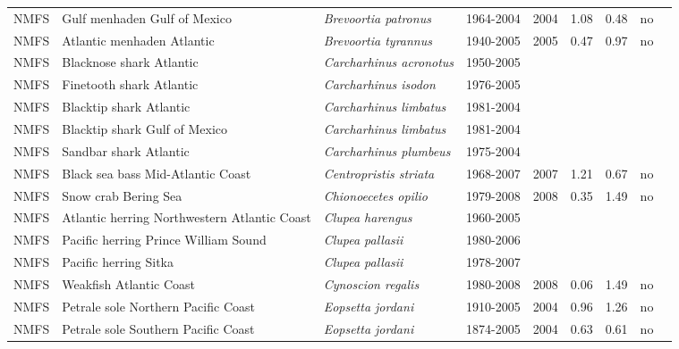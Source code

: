 \begin{longtable}{p{1.8cm}p{4cm}p{4cm}ccccp{1.9cm}c}
  NMFS & Gulf menhaden Gulf of Mexico & \textit{Brevoortia patronus} & 1964-2004 & 2004 & 1.08 & 0.48 & no & \cite{GILROY-MENHADENGM-2007.pdf} \\ 
  NMFS & Atlantic menhaden Atlantic & \textit{Brevoortia tyrannus} & 1940-2005 & 2005 & 0.47 & 0.97 & no & \cite{Atl.Menhaden-ASMFC-2006.pdf} \\ 
  NMFS & Blacknose shark Atlantic & \textit{Carcharhinus acronotus} & 1950-2005 &  &  &  &  & \cite{SmallcoastalAtl2007-SEFSC.pdf} \\ 
  NMFS & Finetooth shark Atlantic & \textit{Carcharhinus isodon} & 1976-2005 &  &  &  &  & \cite{SmallcoastalAtl2007-SEFSC.pdf} \\ 
  NMFS & Blacktip shark Atlantic & \textit{Carcharhinus limbatus} & 1981-2004 &  &  &  &  & \cite{LargeCoastalAtl2006-SEFSC.pdf} \\ 
  NMFS & Blacktip shark Gulf of Mexico & \textit{Carcharhinus limbatus} & 1981-2004 &  &  &  &  & \cite{LargeCoastalAtl2006-SEFSC.pdf} \\ 
  NMFS & Sandbar shark Atlantic & \textit{Carcharhinus plumbeus} & 1975-2004 &  &  &  &  & \cite{LargeCoastalAtl2006-SEFSC.pdf} \\ 
  NMFS & Black sea bass Mid-Atlantic Coast & \textit{Centropristis striata} & 1968-2007 & 2007 & 1.21 & 0.67 & no & \cite{DataPoorReviewPanelReportFinal-1-20-09.pdf} \\ 
  NMFS & Snow crab Bering Sea & \textit{Chionoecetes opilio} & 1979-2008 & 2008 & 0.35 & 1.49 & no & \cite{CRABSAFE2008.pdf} \\ 
  NMFS & Atlantic herring Northwestern Atlantic Coast & \textit{Clupea harengus} & 1960-2005 &  &  &  &  & \cite{Herring2006.pdf} \\ 
  NMFS & Pacific herring Prince William Sound & \textit{Clupea pallasii} & 1980-2006 &  &  &  &  & \cite{NA} \\ 
  NMFS & Pacific herring Sitka & \textit{Clupea pallasii} & 1978-2007 &  &  &  &  & \cite{NA} \\ 
  NMFS & Weakfish Atlantic Coast & \textit{Cynoscion regalis} & 1980-2008 & 2008 & 0.06 & 1.49 & no & \cite{NEFSC-Weakfish-2009.pdf} \\ 
  NMFS & Petrale sole Northern Pacific Coast & \textit{Eopsetta jordani} & 1910-2005 & 2004 & 0.96 & 1.26 & no & \cite{2004_SAFE_WCpetralesole.pdf} \\ 
  NMFS & Petrale sole Southern Pacific Coast & \textit{Eopsetta jordani} & 1874-2005 & 2004 & 0.63 & 0.61 & no & \cite{2004-SAFE-WCpetralesole.pdf} \\ 

\end{longtable}
